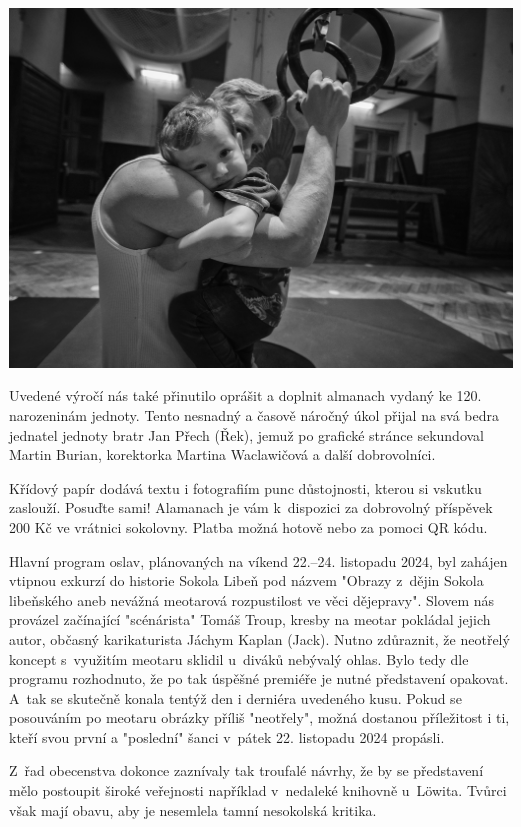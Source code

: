 \documentclass[11pt]{article}
\begin{document}
\begin{center}
  \includegraphics[width=0.7\linewidth]{./FOTKY ZPRAVY/FOTKY GALERIE.jpg}
\end{center}

Uvedené výročí nás také přinutilo oprášit a doplnit almanach vydaný ke
120. narozeninám jednoty. Tento nesnadný a časově náročný úkol přijal na
svá bedra jednatel jednoty bratr Jan Přech (Řek), jemuž po grafické
stránce sekundoval Martin Burian, korektorka Martina Waclawičová a další
dobrovolníci.

Křídový papír dodává textu i fotografiím punc důstojnosti, kterou si
vskutku zaslouží. Posuďte sami! Alamanach je vám k~dispozici za
dobrovolný příspěvek 200 Kč ve vrátnici sokolovny. Platba možná hotově
nebo za pomoci QR kódu.

Hlavní program oslav, plánovaných na víkend 22.--24. listopadu 2024, byl
zahájen vtipnou exkurzí do historie Sokola Libeň pod názvem "Obrazy
z~dějin Sokola libeňského aneb nevážná meotarová rozpustilost ve věci
dějepravy". Slovem nás provázel začínající "scénárista" Tomáš Troup,
kresby na meotar pokládal jejich autor, občasný karikaturista Jáchym
Kaplan (Jack). Nutno zdůraznit, že neotřelý koncept s~využitím meotaru
sklidil u~diváků nebývalý ohlas. Bylo tedy dle programu rozhodnuto, že
po tak úspěšné premiéře je nutné představení opakovat. A~tak se skutečně
konala tentýž den i derniéra uvedeného kusu. Pokud se posouváním po
meotaru obrázky příliš "neotřely", možná dostanou příležitost i ti,
kteří svou první a "poslední" šanci v~pátek 22. listopadu 2024
propásli.

Z~řad obecenstva dokonce zaznívaly tak troufalé návrhy, že by se
představení mělo postoupit široké veřejnosti například v~nedaleké
knihovně u~Löwita. Tvůrci však mají obavu, aby je nesemlela tamní
nesokolská kritika.
\end{document}
